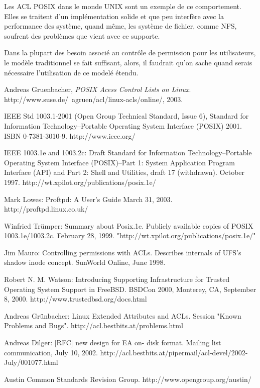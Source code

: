 Les ACL POSIX dans le monde UNIX sont un exemple de ce comportement. Elles se traitent d'un implémentation solide et que peu interfère avec la performance des système, quand même, les système de fichier, comme NFS, soufrent des problèmes que vient avec ce supporte.

Dans la plupart des besoin associé au contrôle de permission pour les utilisateurs, le modèle traditionnel se fait suffisant, alors, il faudrait qu'on sache quand serais nécessaire l'utilisation de ce modelé étendu. 

  




\begin{thebibliography}{9}
 
  Andreas Gruenbacher,
  \emph{POSIX Acess Control Lists on Linux}.
  http://www.suse.de/~agruen/acl/linux-acls/online/,
  2003.

    IEEE Std 1003.1-2001 (Open Group Technical Standard, Issue 6), 
	Standard for Information Technology--Portable Operating System Interface (POSIX) 2001. 
	ISBN 0-7381-3010-9. 
	http://www.ieee.org/

    IEEE 1003.1e and 1003.2c: Draft Standard for Information Technology--Portable Operating System Interface (POSIX)--Part 1: System Application Program Interface (API) and Part 2: Shell and Utilities, draft 17 (withdrawn). 
	October 1997. 
	http://wt.xpilot.org/publications/posix.1e/

	Mark Lowes: 
	Proftpd: 
	A User's Guide March 31, 2003. 
	http://proftpd.linux.co.uk/

    Winfried Trümper: Summary about Posix.1e. Publicly available copies of POSIX 1003.1e/1003.2c. February 28, 1999. "http://wt.xpilot.org/publications/posix.1e/"

	Jim Mauro: Controlling permissions with ACLs. Describes internals of UFS's shadow inode concept. SunWorld Online, June 1998.

	Robert N. M. Watson: Introducing Supporting Infrastructure for Trusted Operating System Support in FreeBSD. BSDCon 2000, Monterey, CA, September 8, 2000. http://www.trustedbsd.org/docs.html
	
	Andreas Grünbacher: Linux Extended Attributes and ACLs. Session "Known Problems and Bugs". http://acl.bestbits.at/problems.html
	
	Andreas Dilger: [RFC] new design for EA on- disk format. Mailing list communication, July 10, 2002. http://acl.bestbits.at/pipermail/acl-devel/2002-July/001077.html
	
	Austin Common Standards Revision Group. http://www.opengroup.org/austin/

\end{thebibliography}


